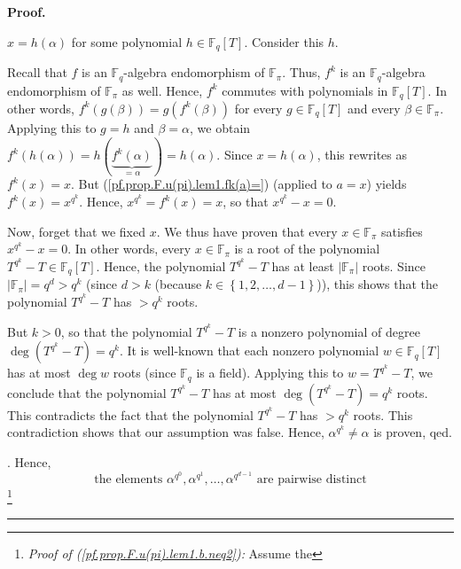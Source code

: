\documentclass[numbers=enddot,12pt,final,onecolumn,notitlepage]{scrartcl}%
\theoremstyle{definition}
\newenvironment{proof}[1][Proof]{\noindent\textbf{#1.} }{\ \rule{0.5em}{0.5em}}
\begin{document}
\begin{proof}
{$x=h\left(  \alpha\right)  $ for some polynomial $h\in\mathbb{F}_{q}\left[
T\right]  $. Consider this $h$.
\par
Recall that $f$ is an $\mathbb{F}_{q}$-algebra endomorphism of $\mathbb{F}%
_{\pi}$. Thus, $f^{k}$ is an $\mathbb{F}_{q}$-algebra endomorphism of
$\mathbb{F}_{\pi}$ as well. Hence, $f^{k}$ commutes with polynomials in
$\mathbb{F}_{q}\left[  T\right]  $. In other words, $f^{k}\left(  g\left(
\beta\right)  \right)  =g\left(  f^{k}\left(  \beta\right)  \right)  $ for
every $g\in\mathbb{F}_{q}\left[  T\right]  $ and every $\beta\in
\mathbb{F}_{\pi}$. Applying this to $g=h$ and $\beta=\alpha$, we obtain
$f^{k}\left(  h\left(  \alpha\right)  \right)  =h\left(  \underbrace{f^{k}%
\left(  \alpha\right)  }_{=\alpha}\right)  =h\left(  \alpha\right)  $. Since
$x=h\left(  \alpha\right)  $, this rewrites as $f^{k}\left(  x\right)  =x$.
But (\ref{pf.prop.F.u(pi).lem1.fk(a)=}) (applied to $a=x$) yields
$f^{k}\left(  x\right)  =x^{q^{k}}$. Hence, $x^{q^{k}}=f^{k}\left(  x\right)
=x$, so that $x^{q^{k}}-x=0$.
\par
Now, forget that we fixed $x$. We thus have proven that every $x\in
\mathbb{F}_{\pi}$ satisfies $x^{q^{k}}-x=0$. In other words, every
$x\in\mathbb{F}_{\pi}$ is a root of the polynomial $T^{q^{k}}-T\in
\mathbb{F}_{q}\left[  T\right]  $. Hence, the polynomial $T^{q^{k}}-T$ has at
least $\left\vert \mathbb{F}_{\pi}\right\vert $ roots. Since $\left\vert
\mathbb{F}_{\pi}\right\vert =q^{d}>q^{k}$ (since $d>k$ (because $k\in\left\{
1,2,\ldots,d-1\right\}  $)), this shows that the polynomial $T^{q^{k}}-T$ has
$>q^{k}$ roots.
\par
But $k>0$, so that the polynomial $T^{q^{k}}-T$ is a nonzero polynomial of
degree $\deg\left(  T^{q^{k}}-T\right)  =q^{k}$. It is well-known that each
nonzero polynomial $w\in\mathbb{F}_{q}\left[  T\right]  $ has at most $\deg w$
roots (since $\mathbb{F}_{q}$ is a field). Applying this to $w=T^{q^{k}}-T$,
we conclude that the polynomial $T^{q^{k}}-T$ has at most $\deg\left(
T^{q^{k}}-T\right)  =q^{k}$ roots. This contradicts the fact that the
polynomial $T^{q^{k}}-T$ has $>q^{k}$ roots. This contradiction shows that our
assumption was false. Hence, $\alpha^{q^{k}}\neq\alpha$ is proven, qed.}.
Hence,%
\begin{equation}
\text{the elements }\alpha^{q^{0}},\alpha^{q^{1}},\ldots,\alpha^{q^{d-1}%
}\text{ are pairwise distinct} \label{pf.prop.F.u(pi).lem1.b.neq2}%
\end{equation}
\footnote{\textit{Proof of (\ref{pf.prop.F.u(pi).lem1.b.neq2}):} Assume the
}
\end{proof}
\end{document}
